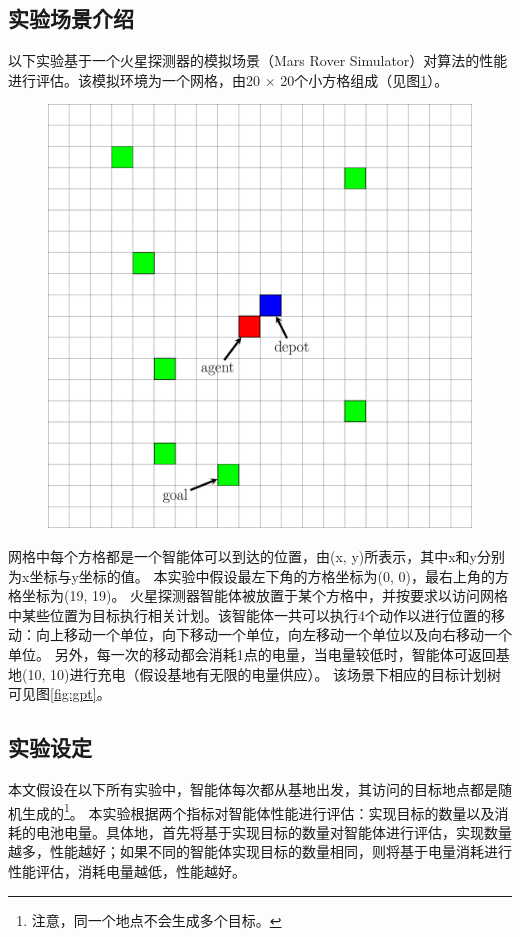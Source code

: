 \subsection{实验场景介绍}
以下实验基于一个火星探测器的模拟场景（Mars Rover Simulator）对\SAM 算法的性能进行评估。该模拟环境为一个网格，由20 $\times$ 20个小方格组成（见图\ref{fig:marsrover}）。
\begin{figure}[h!]
\centering
\includegraphics[scale=0.4]{./figs/mg_example}
\captionsetup{justification=centering}
\label{fig:marsrover}
\end{figure}

网格中每个方格都是一个智能体可以到达的位置，由(x, y)所表示，其中x和y分别为x坐标与y坐标的值。
%
本实验中假设最左下角的方格坐标为(0, 0)，最右上角的方格坐标为(19, 19)。
% 
火星探测器智能体被放置于某个方格中，并按要求以访问网格中某些位置为目标执行相关计划。该智能体一共可以执行4个动作以进行位置的移动：向上移动一个单位，向下移动一个单位，向左移动一个单位以及向右移动一个单位。
% 
另外，每一次的移动都会消耗1点的电量，当电量较低时，智能体可返回基地(10, 10)进行充电（假设基地有无限的电量供应）。
%
该场景下相应的目标计划树可见图\ref{fig:gpt}。
\subsection{实验设定}
本文假设在以下所有实验中，智能体每次都从基地出发，其访问的目标地点都是随机生成的\footnote{注意，同一个地点不会生成多个目标。}。
本实验根据两个指标对智能体性能进行评估：实现目标的数量以及消耗的电池电量。具体地，首先将基于实现目标的数量对智能体进行评估，实现数量越多，性能越好；如果不同的智能体实现目标的数量相同，则将基于电量消耗进行性能评估，消耗电量越低，性能越好。

